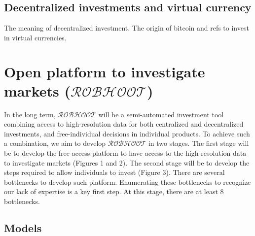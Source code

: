 \documentclass[english,12pt]{article}
\begin{document}
\subsection{Decentralized investments and virtual currency}

The meaning of decentralized investment. The origin of bitcoin and
refs to invest in virtual currencies.

\newpage
\section{Open platform to investigate markets ($\mathcal{ROBHOOT}$)}

In the long term, $\mathcal{ROBHOOT}$ will be a semi-automated investment tool combining
access to high-resolution data for both centralized and decentralized
investments, and free-individual decisions in individual products. To achieve such a combination, we aim to
develop $\mathcal{ROBHOOT}$ in two stages. The first stage will be to
develop the free-access platform to have access to the high-resolution
data to investigate markets (Figures 1 and 2). The second stage will
be to develop the steps required to allow individuals to invest
(Figure 3). There are several bottlenecks to develop such
platform. Enumerating these bottlenecks to recognize our lack of
expertise is a key first step. At this stage, there are at least 8
bottlenecks.

\subsection{Models}
\end{document}
